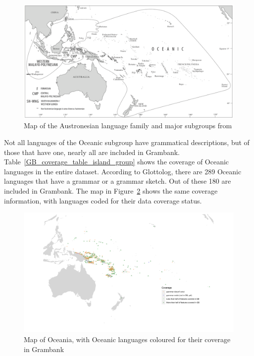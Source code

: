 \documentclass[12pt,letterpaper]{article}
\begin{document}
\begin{figure}[ht]
\centering
\includegraphics[width=17cm]{illustrations/ross_pawley_osmond_protooceanic_vol5.png}
\caption{{Map of the Austronesian language family and major subgroups from \citet[2]{protooceanicvol5}}}
\label{Oceanic_map}
\end{figure} 

Not all languages of the Oceanic subgroup have grammatical descriptions, but of those that have one, nearly all are included in Grambank. Table~\ref{GB_coverage_table_island_group} shows the coverage of Oceanic languages in the entire dataset. According to Glottolog, there are 289 Oceanic languages that have a grammar or a grammar sketch. Out of these 180 are included in Grambank. The map in Figure~\ref{GB_austro_coverage} shows the same coverage information, with languages coded for their data coverage status.



\begin{figure}
\centering
\includegraphics[width=\textwidth]{illustrations/plots_from_R/coverage_plots/maps/coverage_map_oceanic.png}
\caption{Map of Oceania, with Oceanic languages coloured for their coverage in Grambank}
\label{GB_austro_coverage}
\end{figure} %
\end{document}
